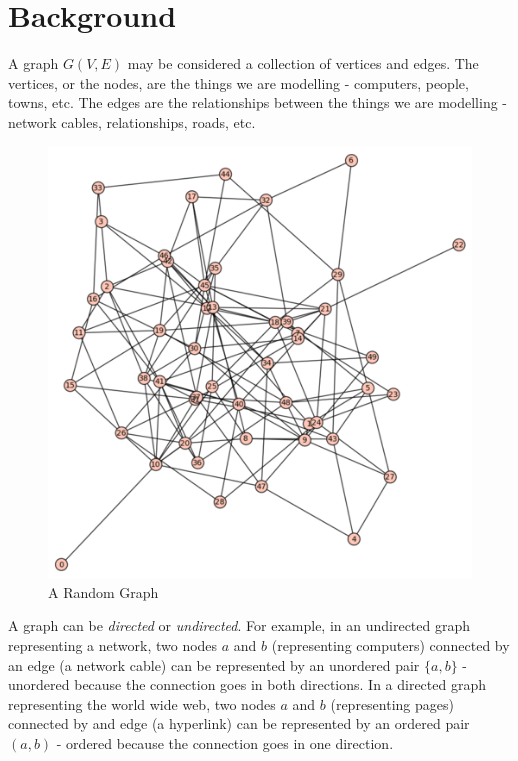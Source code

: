 \documentclass{report}
\begin{document}
\chapter{Background}

A graph $G(V, E)$ may be considered a collection of vertices and edges. The vertices, or the nodes, are 
the things we are modelling - computers, people, towns, etc. The edges are the relationships between the 
things we are modelling - network cables, relationships, roads, etc. \bigskip

\begin{figure}[h]
	\centering
	\includegraphics[scale = 0.5]{random}
	\caption{A Random Graph}
	\label{fig:random}
\end{figure}\medskip

A graph can be \textit{directed} or \textit{undirected}. For example, in an undirected graph representing 
a network, two nodes $a$ and $b$ (representing computers) connected by an edge (a network cable) can be 
represented by an unordered pair $\{a, b\}$ - unordered because the connection goes in both directions. In 
a directed graph representing the world wide web, two nodes $a$ and $b$ (representing pages) connected by 
and edge (a hyperlink) can be represented by an ordered pair $(a, b)$ - ordered because the connection 
goes in one direction. \bigskip
\end{document}
